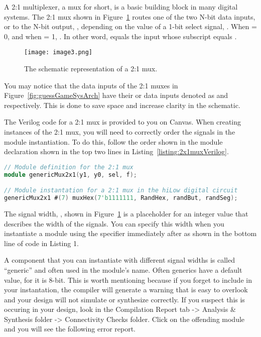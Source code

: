 A 2:1 multiplexer, a mux for short, is a basic building block in many
digital systems. The 2:1 mux shown in Figure~\ref{fig:2x1MuxSymbol} 
routes one of the two
N-bit data inputs,  or  to the N-bit output, , depending
on the value of a 1-bit select signal, . When  = 0,
 and when  = 1, . In other word, 
equals the  input whose subscript equals .

\begin{figure}[ht]
\texttt{[image: image3.png]}
\caption{The schematic representation of a 2:1 mux.}
\label{fig:2x1MuxSymbol}
\end{figure}

You may notice that the data inputs of the 2:1 muxes in Figure~\ref{fig:guessGameSysArch}
 have
their  or  data
inputs denoted as  and  respectively. This is done to save space
and increase clarity in the schematic.

The Verilog code for a 2:1 mux is provided to you on Canvas. When
creating instances of the 2:1 mux, you will need to correctly order the
signals in the module instantiation. To do this, follow the
order shown in the module declaration shown in the top two lines in
Listing~\ref{listing:2x1muxVerilog}.

\begin{lstlisting}[language=Verilog,
 caption={Top, module definition for a 2:1 mux.  Bottom, module instantation 
 of a 2:1 mux in Figure~\ref{fig:guessGameSysArch}.},
 label={listing:2x1muxVerilog},
 frame=single]
// Module definition for the 2:1 mux
module genericMux2x1(y1, y0, sel, f);

// Module instantation for a 2:1 mux in the hiLow digital circuit
genericMux2x1 #(7) muxHex(7'b1111111, RandHex, randBut, randSeg);
\end{lstlisting}

The signal width, , shown in Figure~\ref{fig:2x1MuxSymbol} is a 
placeholder for an integer value that describes the width of the 
 signals.  You can specify this width when you instantiate a  module using the \hdl{\#()} specifier immediately after  as shown in the bottom line of code in Listing 1. 

A component
that you can instantiate with different signal widths is called
``generic'' and often used in the module's name.  Often generics
have a default value, for  it is 8-bit. This is 
worth mentioning because if you forget to include  in your
instantation, the compiler will generate a warning that is easy to
overlook and your design will not simulate or synthesize correctly.
If you suspect this is occuring in your design,  look in the Compilation
Report tab -\textgreater{} Analysis \& Synthesis folder -\textgreater{}
Connectivity Checks folder. Click on the offending module and you will
see the following error report. 

